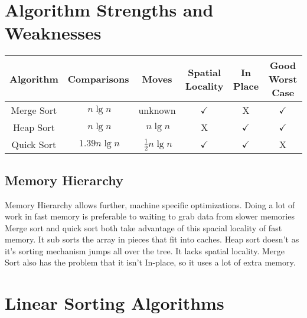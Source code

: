 \documentclass[english, 10pt]{article}
\begin{document}
\section{Algorithm Strengths and Weaknesses}

\begin{center}
\begin{tabular}{cccccc}
    Algorithm  & Comparisons      & Moves                 & Spatial Locality & In Place     & Good Worst Case \\ \toprule
    Merge Sort & $~n\lg n$        & unknown               & $\checkmark$     & X            & $\checkmark$ \\ \midrule
    Heap Sort  & $~n\lg n$        & $~n \lg n$            & X                & $\checkmark$ & $\checkmark$ \\ \midrule
    Quick Sort & $~1.39 n \lg n $ & $~\frac{1}{2}n\lg n $ & $\checkmark$     & $\checkmark$ & X \\
\end{tabular}
\end{center}

\subsection{Memory Hierarchy}
Memory Hierarchy allows further, machine specific optimizations. Doing a lot of
work in fast memory is preferable to waiting to grab data from slower memories
Merge sort and quick sort both take advantage of this spacial locality of fast
memory. It sub sorts the array in pieces that fit into caches. Heap sort
doesn't as it's sorting mechanism jumps all over the tree. It lacks spatial
locality. Merge Sort also has the problem that it isn't In-place, so it uses a
lot of extra memory.


\section{Linear Sorting Algorithms}
\end{document}

